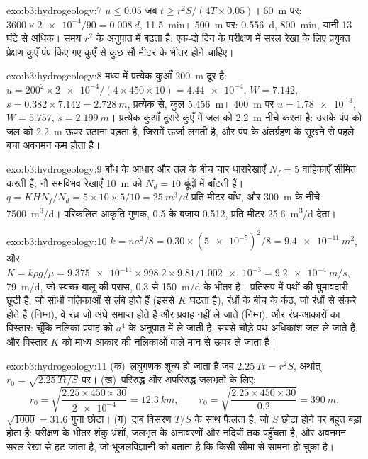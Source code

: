 \begin{solution}{exo:b3:hydrogeology:7}
$u \le 0.05$ जब $t \ge r^2S/(4T\times0.05)$। \qty{60}{m} पर: $3600\times
\num{2e-4}/90 = \qty{0.008}{d}$, \qty{11.5}{min}। \qty{500}{m} पर:
\qty{0.556}{d}, \qty{800}{min}, यानी 13 घंटे से अधिक। समय $r^2$ के
अनुपात में बढ़ता है: एक-दो दिन के परीक्षण में सरल रेखा के लिए प्रयुक्त
प्रेक्षण कुएँ पंप किए गए कुएँ से कुछ सौ मीटर के भीतर होने चाहिए।
\end{solution}

\begin{solution}{exo:b3:hydrogeology:8}
मध्य में प्रत्येक कुआँ \qty{200}{m} दूर है: $u = 200^2\times\num{2e-4}/(4
\times450\times10) = \num{4.44e-4}$, $W = \num{7.142}$, $s = 0.382\times
7.142 = \qty{2.728}{m}$, प्रत्येक से, कुल \qty{5.456}{m}। \qty{400}{m} पर
$u = \num{1.78e-3}$, $W = \num{5.757}$, $s =
\qty{2.199}{m}$। प्रत्येक कुआँ दूसरे कुएँ में जल को \qty{2.2}{m} नीचे करता है:
उसके पंप को जल को \qty{2.2}{m} ऊपर उठाना पड़ता है, जिसमें ऊर्जा लगती है,
और पंप के अंतर्ग्रहण के सूखने से पहले बचा अवनमन
कम होता है।
\end{solution}

\begin{solution}{exo:b3:hydrogeology:9}
बाँध के आधार और तल के बीच चार धारारेखाएँ $N_f = 5$
वाहिकाएँ सीमित करती हैं; नौ समविभव रेखाएँ \qty{10}{m} को $N_d = 10$
बूंदों में बाँटती हैं। $q = KHN_f/N_d = 5\times10\times5/10 = \qty{25}{m^3/d}$ प्रति मीटर
बाँध, और \qty{300}{m} के नीचे \qty{7500}{m^3/d}। परिकलित आकृति
गुणक, 0.5 के बजाय 0.512, प्रति मीटर \qty{25.6}{m^3/d} देता।
\end{solution}

\begin{solution}{exo:b3:hydrogeology:10}
$k = na^2/8 = 0.30\times(\num{5e-5})^2/8 = \qty{9.4e-11}{m^2}$, और $K =
k\rho g/\mu = \num{9.375e-11}\times998.2\times9.81/\num{1.002e-3} =
\qty{9.2e-4}{m/s}$, \qty{79}{m/d}, जो स्वच्छ बालू की परास, 0.3 से
\qty{150}{m/d} के भीतर है। प्रतिरूप में पथों की घुमावदारी छूटी है,
जो सीधी नलिकाओं से लंबे होते हैं (इससे $K$ घटता है), रंध्रों के बीच के कंठ,
जो रंध्रों से संकरे होते हैं (निम्न), वे रंध्र जो अंधे समाप्त
होते हैं और प्रवाह नहीं ले जाते (निम्न), और रंध्र-आकारों का
विस्तार: चूँकि नलिका प्रवाह को $a^4$ के अनुपात में ले जाती है,
सबसे चौड़े पथ अधिकांश जल ले जाते हैं, और विस्तार $K$ को माध्य आकार की नलिकाओं वाले मान से ऊपर ले जाता है।
\end{solution}

\begin{solution}{exo:b3:hydrogeology:11}
(क)~लघुगणक शून्य हो जाता है जब $2.25\,Tt = r^2S$, अर्थात् $r_0 =
\sqrt{2.25\,Tt/S}$ पर। (ख)~परिरुद्ध और अपरिरुद्ध जलभृतों के लिए:
\[
r_0 = \sqrt{\frac{2.25\times450\times30}{\num{2e-4}}} = \qty{12.3}{km},
\qquad r_0 = \sqrt{\frac{2.25\times450\times30}{0.2}} = \qty{390}{m},
\]
$\sqrt{1000} = 31.6$ गुना छोटा। (ग)~दाब विसरण $T/S$ के साथ फैलता है,
जो $S$ छोटा होने पर बहुत बड़ा होता है: परीक्षण के भीतर शंकु
भ्रंशों, जलभृत के अनावरणों और नदियों तक पहुँचता है, और अवनमन सरल
रेखा से हट जाता है, जो भूजलविज्ञानी को बताता है
कि किसी सीमा से सामना हो चुका है।
\end{solution}

